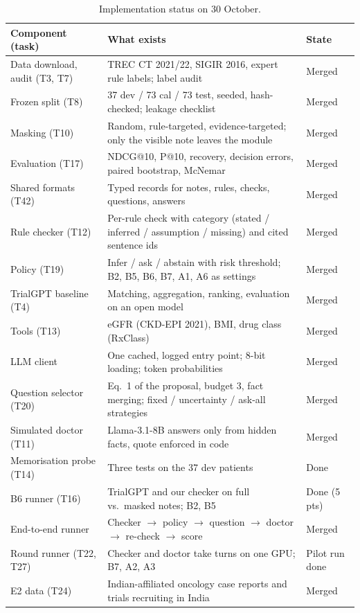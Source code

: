 \documentclass[10pt,a4paper,twocolumn]{article}
\begin{document}
\begin{table}[H]
\centering\footnotesize
\begin{tabularx}{\columnwidth}{@{}P{2.75cm}LP{1.25cm}@{}}
\toprule
\textbf{Component (task)} & \textbf{What exists} & \textbf{State}\\
\midrule
Data download, audit (T3, T7) & TREC CT 2021/22, SIGIR 2016, expert rule labels; label audit & Merged\\
Frozen split (T8) & 37 dev / 73 cal / 73 test, seeded, hash-checked; leakage checklist & Merged\\
Masking (T10) & Random, rule-targeted, evidence-targeted; only the visible note leaves the module & Merged\\
Evaluation (T17) & NDCG@10, P@10, recovery, decision errors, paired bootstrap, McNemar & Merged\\
Shared formats (T42) & Typed records for notes, rules, checks, questions, answers & Merged\\
Rule checker (T12) & Per-rule check with category (stated / inferred / assumption / missing) and cited sentence ids & Merged\\
Policy (T19) & Infer / ask / abstain with risk threshold; B2, B5, B6, B7, A1, A6 as settings & Merged\\
TrialGPT baseline (T4) & Matching, aggregation, ranking, evaluation on an open model & Merged\\
Tools (T13) & eGFR (CKD-EPI 2021), BMI, drug class (RxClass) & Merged\\
LLM client & One cached, logged entry point; 8-bit loading; token probabilities & Merged\\
Question selector (T20) & Eq.~1 of the proposal, budget 3, fact merging; fixed / uncertainty / ask-all strategies & Merged\\
Simulated doctor (T11) & Llama-3.1-8B answers only from hidden facts, quote enforced in code & Merged\\
Memorisation probe (T14) & Three tests on the 37 dev patients & Done\\
B6 runner (T16) & TrialGPT and our checker on full vs.\ masked notes; B2, B5 & Done (5 pts)\\
End-to-end runner & Checker \(\rightarrow\) policy \(\rightarrow\) question \(\rightarrow\) doctor \(\rightarrow\) re-check \(\rightarrow\) score & Merged\\
Round runner (T22, T27) & Checker and doctor take turns on one GPU; B7, A2, A3 & Pilot run done\\
E2 data (T24) & Indian-affiliated oncology case reports and trials recruiting in India & Merged\\
\bottomrule
\end{tabularx}
\caption{Implementation status on 30 October.}
\label{tab:progress}
\end{table}
\end{document}
